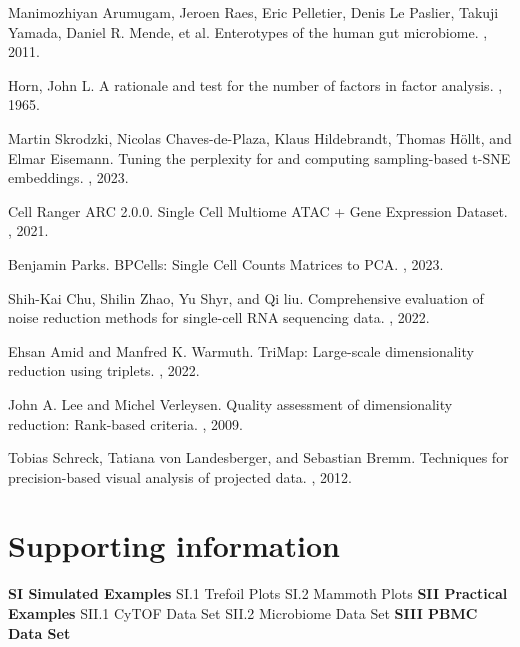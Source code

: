 \documentclass{article}
\begin{document}
\begin{thebibliography}{10}
Manimozhiyan Arumugam, Jeroen Raes, Eric Pelletier, Denis Le Paslier, Takuji Yamada, Daniel R. Mende, et al.
\newblock Enterotypes of the human gut microbiome.
, 2011.

Horn, John L.
\newblock A rationale and test for the number of factors in factor analysis.
, 1965.

Martin Skrodzki, Nicolas Chaves-de-Plaza, Klaus Hildebrandt, Thomas H\"ollt, and Elmar Eisemann.
\newblock Tuning the perplexity for and computing sampling-based t-SNE embeddings.
, 2023.

Cell Ranger ARC 2.0.0.
\newblock Single Cell Multiome ATAC + Gene Expression Dataset.
, 2021.

Benjamin Parks.
\newblock BPCells: Single Cell Counts Matrices to PCA.
, 2023.

Shih-Kai Chu, Shilin Zhao, Yu Shyr, and Qi liu.
\newblock Comprehensive evaluation of noise reduction methods for single-cell RNA sequencing data.
, 2022.

Ehsan Amid and Manfred K. Warmuth. 
\newblock TriMap: Large-scale dimensionality reduction using triplets. 
, 2022.

John A. Lee and Michel Verleysen.
\newblock Quality assessment of dimensionality reduction: Rank-based criteria.
, 2009.

Tobias Schreck, Tatiana von Landesberger, and Sebastian Bremm.
\newblock Techniques for precision-based visual analysis of projected data.
, 2012.

\end{thebibliography}

\section{Supporting information}
\textbf{SI Simulated Examples}
\newline SI.1 Trefoil Plots
\newline SI.2 Mammoth Plots
\newline\textbf{SII Practical Examples}
\newline SII.1 CyTOF Data Set
\newline SII.2 Microbiome Data Set
\newline\textbf{SIII PBMC Data Set}
\end{document}
